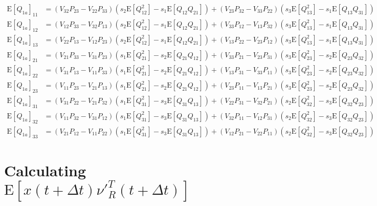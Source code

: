 \documentclass[10pt]{article}
\newcommand{\expect}[1]{\ensuremath{\mathrm{E}\left[ #1 \right]}}
\begin{document}
\begin{align} \label{eqn:Q1a}
	\expect{Q_{1a}}_{11} &= (V_{32}P_{23}-V_{22}P_{33})(s_2\expect{Q_{12}^2}-s_1\expect{Q_{12}Q_{21}}) + (V_{23}P_{32}-V_{33}P_{22})(s_3\expect{Q_{13}^2}-s_1\expect{Q_{13}Q_{31}}) \nonumber \\
	\expect{Q_{1a}}_{12} &= (V_{12}P_{33}-V_{32}P_{13})(s_2\expect{Q_{12}^2}-s_1\expect{Q_{12}Q_{21}}) + 
	(V_{33}P_{12}-V_{13}P_{32})(s_3\expect{Q_{13}^2}-s_1\expect{Q_{13}Q_{31}}) \nonumber \\
	\expect{Q_{1a}}_{13} &= (V_{22}P_{13}-V_{12}P_{23})(s_2\expect{Q_{12}^2}-s_1\expect{Q_{12}Q_{21}}) + (V_{13}P_{22}-V_{23}P_{12})(s_3\expect{Q_{13}^2}-s_1\expect{Q_{13}Q_{31}}) \nonumber \\
	\expect{Q_{1a}}_{21} &= (V_{21}P_{33}-V_{31}P_{23})(s_1\expect{Q_{21}^2}-s_2\expect{Q_{21}Q_{12}}) + (V_{33}P_{21}-V_{23}P_{31})(s_3\expect{Q_{23}^2}-s_2\expect{Q_{23}Q_{32}}) \nonumber \\
	\expect{Q_{1a}}_{22} &= (V_{31}P_{13}-V_{11}P_{33})(s_1\expect{Q_{21}^2}-s_2\expect{Q_{21}Q_{12}}) + (V_{13}P_{31}-V_{33}P_{11})(s_3\expect{Q_{23}^2}-s_2\expect{Q_{23}Q_{32}}) \nonumber \\
	\expect{Q_{1a}}_{23} &= (V_{11}P_{23}-V_{21}P_{13})(s_1\expect{Q_{21}^2}-s_2\expect{Q_{21}Q_{12}}) + (V_{23}P_{11}-V_{13}P_{21})(s_3\expect{Q_{23}^2}-s_2\expect{Q_{23}Q_{32}}) \nonumber \\
	\expect{Q_{1a}}_{31} &= (V_{31}P_{22}-V_{21}P_{32})(s_1\expect{Q_{31}^2}-s_3\expect{Q_{31}Q_{13}}) + (V_{22}P_{31}-V_{32}P_{21})(s_2\expect{Q_{32}^2}-s_3\expect{Q_{32}Q_{23}}) \nonumber \\
	\expect{Q_{1a}}_{32} &= (V_{11}P_{32}-V_{31}P_{12})(s_1\expect{Q_{31}^2}-s_3\expect{Q_{31}Q_{13}}) + (V_{32}P_{11}-V_{12}P_{31})(s_2\expect{Q_{32}^2}-s_3\expect{Q_{32}Q_{23}}) \nonumber \\
	\expect{Q_{1a}}_{33} &= (V_{21}P_{12}-V_{11}P_{22})(s_1\expect{Q_{31}^2}-s_3\expect{Q_{31}Q_{13}}) + (V_{12}P_{21}-V_{22}P_{11})(s_2\expect{Q_{32}^2}-s_3\expect{Q_{32}Q_{23}})
\end{align}

\section{Calculating $\expect{x(t+\Delta t)\nu'^T_R(t+\Delta t)}$}
\end{document}

